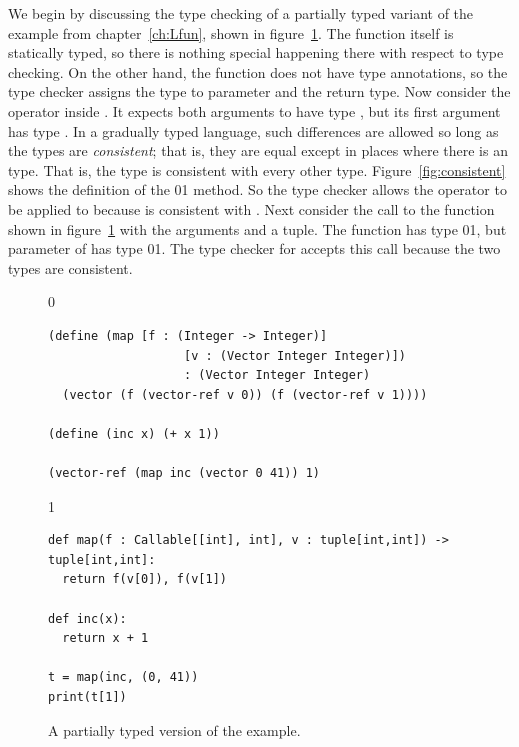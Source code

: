 \documentclass[7x10]{TimesAPriori_MIT}%
\def\racketEd{0}
\def\pythonEd{1}
\providecommand{\BookEdition}{1}
\let\edition\BookEdition
\newcommand{\racket}[1]{{\if\edition\racketEd{#1}\fi}}
\newcommand{\pythonColor}[0]{}
\newcommand{\python}[1]{{\if\edition\pythonEd\pythonColor #1\fi}}
\numberwithin{theorem}{chapter}
\numberwithin{definition}{chapter}
\numberwithin{equation}{chapter}
\begin{document}
We begin by discussing the type checking of a partially typed variant
of the  example from chapter~\ref{ch:Lfun}, shown in
figure~\ref{fig:gradual-map}.  The  function itself is
statically typed, so there is nothing special happening there with
respect to type checking. On the other hand, the  function
does not have type annotations, so the type checker assigns the type
\CANYTY{} to parameter  and the return type.  Now consider the
\code{+} operator inside . It expects both arguments to have
type \INTTY{}, but its first argument  has type \CANYTY{}.  In
a gradually typed language, such differences are allowed so long as
the types are \emph{consistent}; that is, they are equal except in
places where there is an \CANYTY{} type. That is, the type \CANYTY{}
is consistent with every other type.  Figure~\ref{fig:consistent}
shows the definition of the
\racket{}\python{} method.
%
So the type checker allows the \code{+} operator to be applied
to  because \CANYTY{} is consistent with \INTTY{}.
%
Next consider the call to the  function shown in
figure~\ref{fig:gradual-map} with the arguments  and a
tuple. The  function has type
\racket{}\python{},
but parameter  of  has type
\racket{}\python{}.
The type checker for \LangGrad{} accepts this call because the two types are
consistent.

\begin{figure}[hbtp]
  \begin{tcolorbox}[colback=white]
{\if\edition\racketEd
    \begin{lstlisting}
(define (map [f : (Integer -> Integer)]
                   [v : (Vector Integer Integer)])
                   : (Vector Integer Integer)
  (vector (f (vector-ref v 0)) (f (vector-ref v 1))))

(define (inc x) (+ x 1))

(vector-ref (map inc (vector 0 41)) 1)
    \end{lstlisting}
    \fi}
{\if\edition\pythonEd\pythonColor
\begin{lstlisting}
def map(f : Callable[[int], int], v : tuple[int,int]) -> tuple[int,int]:
  return f(v[0]), f(v[1])

def inc(x):
  return x + 1

t = map(inc, (0, 41))
print(t[1])
\end{lstlisting}
  \fi}
  \end{tcolorbox}

  \caption{A partially typed version of the  example.}
\label{fig:gradual-map}
\end{figure}
\end{document}
